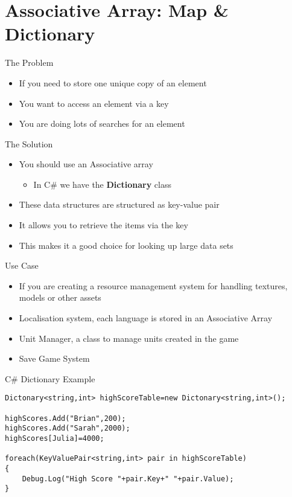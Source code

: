 \part{Associative Array: Map \& Dictionary}
\frame{\partpage}

\begin{frame}{The Problem}
	\begin{itemize}
		\pause \item If you need to store one unique copy of an element
		\pause \item You want to access an element via a key
		\pause \item You are doing lots of searches for an element
	\end{itemize}
\end{frame}

\begin{frame}{The Solution}
	\begin{itemize}
		\pause \item You should use an Associative array
		\begin{itemize}
			\pause \item In C\# we have the \textbf{Dictionary} class
		\end{itemize} 
		\pause \item These data structures are structured as key-value pair
		\pause \item It allows you to retrieve the items via the key
		\pause \item This makes it a good choice for looking up large data sets
	\end{itemize}
\end{frame}

\begin{frame}{Use Case}
	\begin{itemize}
		\pause \item If you are creating a resource management system for handling textures, models or other assets
		\pause \item Localisation system, each language is stored in an Associative Array
		\pause \item Unit Manager, a class to manage units created in the game
		\pause \item Save Game System
	\end{itemize}
\end{frame}

\begin{frame}[fragile]{C\# Dictionary
Example}
\begin{lstlisting}
Dictonary<string,int> highScoreTable=new Dictonary<string,int>();

highScores.Add("Brian",200);
highScores.Add("Sarah",2000);
highScores[Julia]=4000;

foreach(KeyValuePair<string,int> pair in highScoreTable)
{
	Debug.Log("High Score "+pair.Key+" "+pair.Value);
}
\end{lstlisting}
\end{frame}

